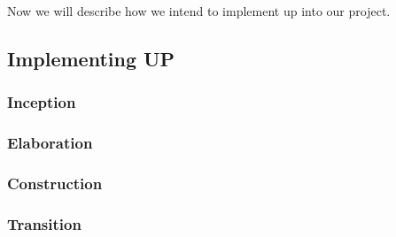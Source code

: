 Now we will describe how we intend to implement \ac{up} into our project.

\subsection{Implementing UP}


\subsubsection{Inception}


\subsubsection{Elaboration}


\subsubsection{Construction}


\subsubsection{Transition}

